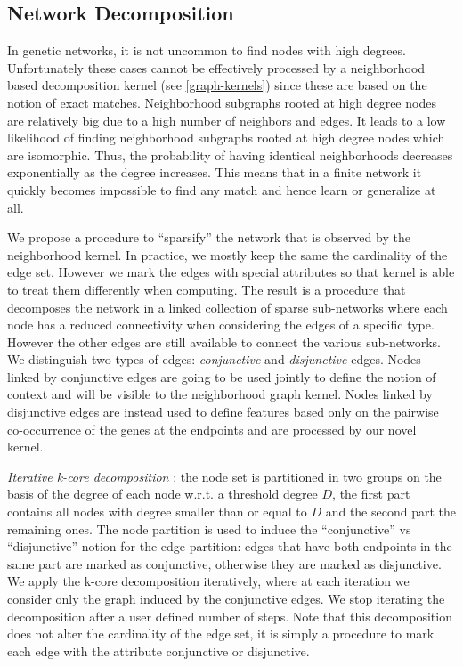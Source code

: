 \documentclass[review]{elsarticle}
\begin{document}
\subsection{Network Decomposition} 
\label{network-decomposition}
In genetic networks, it is not uncommon to find nodes with high degrees. Unfortunately these cases cannot be effectively processed by a neighborhood based decomposition kernel (see \ref{graph-kernels}) since these are based on the notion of exact matches. Neighborhood subgraphs rooted at high degree nodes are relatively big due to a high number of neighbors and edges. It leads to a low likelihood of finding neighborhood subgraphs rooted at high degree nodes which are isomorphic. Thus, the probability of having identical neighborhoods decreases exponentially as the degree increases. This means that in a finite network it quickly becomes impossible to find any match and hence learn or generalize at all. 

We propose a procedure to ``sparsify'' the network that is observed by the neighborhood kernel. In practice, we mostly keep the same the cardinality of the edge set. However we mark the edges with special attributes so that kernel is able to treat them differently when computing. The result is a procedure that decomposes the network in a linked collection of sparse sub-networks where each node has a reduced connectivity when considering the edges of a specific type. However the other edges are still available to connect the various sub-networks. We distinguish two types of edges: {\em conjunctive} and {\em disjunctive} edges. Nodes linked by conjunctive edges are going to be used jointly to define the notion of context and will be visible to the neighborhood graph kernel. Nodes linked by disjunctive edges are instead used to define features based only on the pairwise co-occurrence of the genes at the endpoints and are processed by our novel kernel.

\textit{Iterative k-core decomposition} \cite{alvarez2005k}: the node set is partitioned in two groups on the basis of the degree of each node w.r.t. a threshold degree $D$, the first part contains all nodes with degree smaller than or equal to $D$ and the second part the remaining ones. The node partition is used to induce the ``conjunctive'' vs ``disjunctive'' notion for the edge partition: edges that have both endpoints in the same part are marked as conjunctive, otherwise they are marked as disjunctive. We apply the k-core decomposition iteratively, where at each iteration we consider only the graph induced by the conjunctive edges. We stop iterating the decomposition after a user defined number of steps. Note that this decomposition does not alter the cardinality of the edge set, it is simply a procedure to mark each edge with the attribute conjunctive or disjunctive.  
\end{document}
